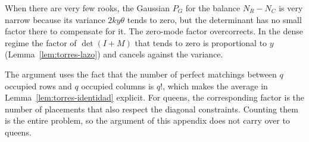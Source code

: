 \begin{observacion}[Interpretation]
When there are very few rooks, the Gaussian $P_G$ for the balance $N_R-N_C$ is very narrow because its
variance
$2ky\theta$ tends to zero, but the determinant has no small factor there to compensate for it. The
zero-mode factor overcorrects. In the dense regime the factor of $\det(I+M)$ that tends to zero
is proportional to $y$ (Lemma~\ref{lem:torres-lazo}) and cancels against the variance.

The argument uses the fact that the number of perfect matchings between $q$ occupied rows and $q$ occupied
columns is $q!$, which makes the average in Lemma~\ref{lem:torres-identidad} explicit. For queens, the
corresponding factor is the number of placements that also respect the diagonal constraints. Counting them
is the
entire problem, so the argument of this appendix does not carry over to queens.
\end{observacion}
